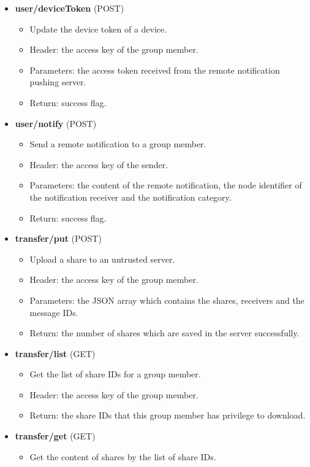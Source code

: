 \documentclass[a4paper,11pt]{report}
\begin{document}
\begin{itemize}[leftmargin=7mm]
\begin{itemize}
	\end{itemize}
	\item 
	\textbf{user/deviceToken} (POST)
	\begin{itemize}
		\item Update the device token of a device.
		\item Header: the access key of the group member.
		\item Parameters: the access token received from the remote notification pushing server.
		\item Return: success flag.
	\end{itemize}
	\item 
	\textbf{user/notify} (POST)
	\begin{itemize}
		\item Send a remote notification to a group member.
		\item Header: the access key of the sender.
		\item Parameters:  the content of the remote notification, the node identifier of the notification receiver and the notification category.
		\item Return: success flag.
	\end{itemize}
	\item 
	\textbf{transfer/put} (POST)
	\begin{itemize}
		\item Upload a share to an untrusted server.
		\item Header: the access key of the group member.
		\item Parameters: the JSON array which contains the shares, receivers and the message IDs.
		\item Return: the number of shares which are saved in the server successfully.
	\end{itemize}
	\item 
	\textbf{transfer/list} (GET)
	\begin{itemize}
		\item Get the list of share IDs for a group member.
		\item Header: the access key of the group member.
		\item Return: the share IDs that this group member has privilege to download.
	\end{itemize}
	\item 
	\textbf{transfer/get} (GET)
	\begin{itemize}
		\item Get the content of shares by the list of share IDs.

\end{itemize}
\end{itemize}
\end{document}
